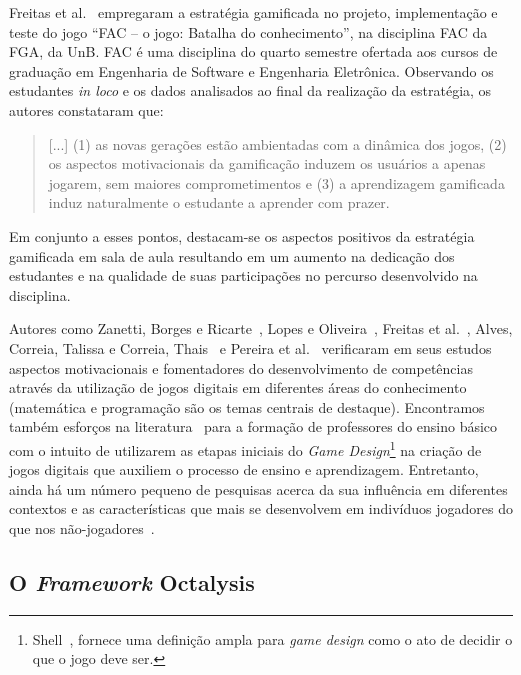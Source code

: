 Freitas et al.~\cite{freitas_gamificacao_2016} empregaram a estratégia gamificada no projeto, implementação e teste do jogo “FAC – o jogo: Batalha do conhecimento”, na disciplina \acrfull{FAC} da \acrfull{FGA}, da \acrfull{UnB}. \acrshort{FAC} é uma disciplina do quarto semestre ofertada aos cursos de graduação em Engenharia de Software e Engenharia Eletrônica. Observando os estudantes \textit{in loco} e os dados analisados ao final da realização da estratégia, os autores constataram que:

\begin{quote}
[...] (1) as novas gerações estão ambientadas com a dinâmica dos jogos, (2) os aspectos motivacionais da gamificação induzem os usuários a apenas jogarem, sem maiores comprometimentos e (3) a aprendizagem gamificada induz naturalmente o estudante a aprender com prazer.~\cite[~p.378]{freitas_gamificacao_2016}
\end{quote}

Em conjunto a esses pontos, destacam-se os aspectos positivos da estratégia gamificada em sala de aula resultando em um aumento na dedicação dos estudantes e na qualidade de suas participações no percurso desenvolvido na disciplina.

Autores como Zanetti, Borges e Ricarte~\cite{zanetti_pensamento_2016}, Lopes e Oliveira~\cite{lopes_videojogos_2013}, Freitas et al.~\cite{freitas_gamificacao_2016},  Alves, Correia, Talissa e Correia, Thais~\cite{correia_revisao_2016} e Pereira et al.~\cite{pereira_jogos_2016} verificaram em seus estudos aspectos motivacionais e fomentadores do desenvolvimento de competências através da utilização de jogos digitais em diferentes áreas do conhecimento (matemática e programação são os temas centrais de destaque). Encontramos também esforços na literatura~\cite{araujo_construcao_2016} para a formação de professores do ensino básico com o intuito de utilizarem as etapas iniciais do \textit{Game Design}\footnote{Shell~\cite{schell_art_2014}, fornece uma definição ampla para \textit{game design} como o ato de decidir o que o jogo deve ser.} na criação de jogos digitais que auxiliem o processo de ensino e aprendizagem. Entretanto, ainda há um número pequeno de pesquisas acerca da sua influência em diferentes contextos e as características que mais se desenvolvem em indivíduos jogadores do que nos não-jogadores~\cite{correia_revisao_2016}.

\subsection{O \textit{Framework} Octalysis} \label{ssec:octalysis}

